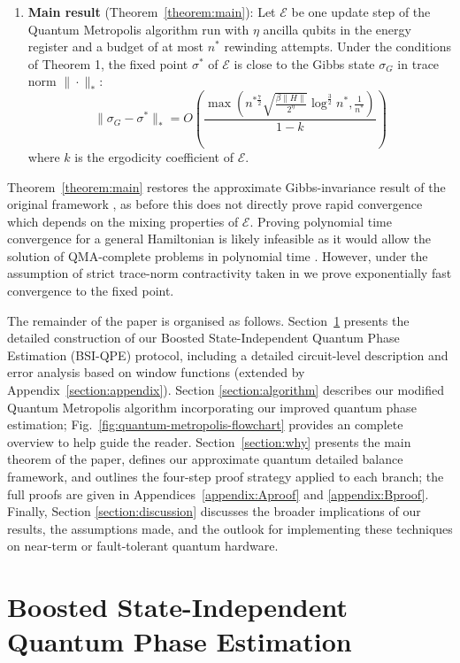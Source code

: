 \documentclass[aps,floatfix,10pt,amssymb,amsfont,amsmath,superscriptaddress,float,nofootinbib,longbibliography,nobalancelastpage,twocolumn]{revtex4-2}
\begin{document}
\begin{enumerate}
    \item \textbf{Main result} (Theorem~\ref{theorem:main}): Let $\mathcal{E}$ be one  update step of the Quantum Metropolis algorithm run with $\eta$ ancilla qubits in the energy register and a budget of at most $n^*$ rewinding attempts. Under the conditions of Theorem 1, the fixed point $\sigma^*$ of $\mathcal{E}$ is close to the Gibbs state $\sigma_G$ in trace norm $\|\cdot\|_*$:
    \begin{equation}
       \|\sigma_G- \sigma^*\|_* = O\left(\frac{\max\left( n^{*\frac{7}{2}}\sqrt{\frac{\beta\|H\| }{2^{\eta}}}\log^{\frac{3}{2}}n^*,\frac{1}{n^*}\right)}{1-k}\right)
    \end{equation}
    where $k$ is the ergodicity coefficient of $\mathcal{E}$.
\end{enumerate}
Theorem~\ref{theorem:main} restores the approximate Gibbs-invariance result of the original framework \cite{Temme_2011}, as before this does not directly prove rapid convergence which depends on the mixing properties of $\mathcal{E}$. Proving polynomial time convergence for a general Hamiltonian is likely infeasible as it would allow the solution of QMA-complete problems in polynomial time \cite{kempe2006complexity}. However, under the assumption of strict trace-norm contractivity taken in \cite{Temme_2011} we prove exponentially fast convergence to the fixed point.


The remainder of the paper is organised as follows. Section~\ref{section:boostedphaseestimation} presents the detailed construction of our Boosted State-Independent Quantum Phase Estimation (BSI-QPE) protocol, including a detailed circuit-level description and error analysis based on window functions (extended by Appendix~\ref{section:appendix}). Section \ref{section:algorithm} describes our modified Quantum Metropolis algorithm incorporating our improved quantum phase estimation; Fig.~\ref{fig:quantum-metropolis-flowchart} provides an complete overview to help guide the reader. Section~\ref{section:why} presents the main theorem of the paper, defines our approximate quantum detailed balance framework, and outlines the four-step proof strategy applied to each branch; the full proofs are given in Appendices~\ref{appendix:Aproof} and \ref{appendix:Bproof}. Finally, Section \ref{section:discussion} discusses the broader implications of our results, the assumptions made, and the outlook for implementing these techniques on near-term or fault-tolerant quantum hardware.


\section{Boosted State-Independent Quantum Phase Estimation}
\label{section:boostedphaseestimation}
\end{document}
